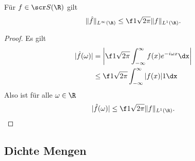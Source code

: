 \begin{st} \label{4.17}
	Für $f \in \scr S(\R)$ gilt
	\[
		\| \hat f \|_{L^\infty(\R)} \le \f 1{\sqrt{2\pi}} \|f\|_{L^1(\R)}.
	\]
	\begin{proof}
		Es gilt
		\begin{align*}
			|\hat f(\omega)|
			&= \bigg| \f 1{\sqrt{2\pi}} \int_{-\infty}^\infty f(x) e^{-i\omega x} \dx \bigg| \\
			&\le \f 1{\sqrt{2\pi}} \int_{-\infty}^\infty |f(x)| 1 \dx
		\end{align*}
		Also ist für alle $\omega \in \R$
		\[
			|\hat f(\omega)| \le \f 1{\sqrt{2\pi}} \|f\|_{L^1(\R)}.
		\]
	\end{proof}
\end{st}


\subsection{Dichte Mengen}


